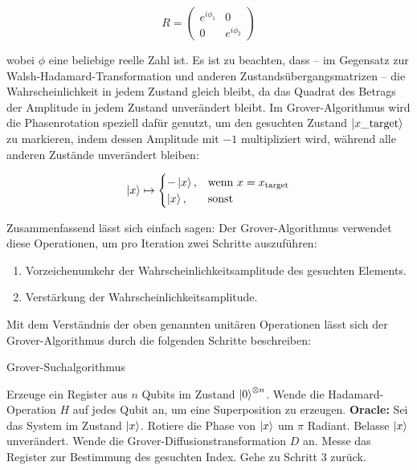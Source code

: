 \begin{enumerate}
    $$
R = \begin{pmatrix}
e^{i\phi_1} & 0 \\
0 & e^{i\phi_2}
\end{pmatrix}
$$

wobei \( \phi \) eine beliebige reelle Zahl ist. Es ist zu beachten, dass – im Gegensatz zur Walsh-Hadamard-Transformation und anderen Zustandsübergangsmatrizen – die Wahrscheinlichkeit in jedem Zustand gleich bleibt, da das Quadrat des Betrags der Amplitude in jedem Zustand unverändert bleibt.
Im Grover-Algorithmus wird die Phasenrotation speziell dafür genutzt, um den gesuchten Zustand $\ket{x\_{\text{target}}}$ zu markieren, indem dessen Amplitude mit $-1$ multipliziert wird, während alle anderen Zustände unverändert bleiben:

$$
\ket{x} \mapsto 
\begin{cases}
- \ket{x}, & \text{wenn } x = x_{\text{target}} \\
\ket{x}, & \text{sonst}
\end{cases}
$$

\end{enumerate}

Zusammenfassend lässt sich einfach sagen: Der Grover-Algorithmus verwendet diese Operationen, um pro Iteration zwei Schritte auszuführen:
\begin{enumerate}
  \item Vorzeichenumkehr der Wahrscheinlichkeitsamplitude des gesuchten Elements.
  \item Verstärkung der Wahrscheinlichkeitsamplitude.
\end{enumerate}

Mit dem Verständnis der oben genannten unitären Operationen lässt sich der Grover-Algorithmus durch die folgenden Schritte beschreiben:

\begin{algorithm}[H]
\label{alg:grover}
\caption{Grover-Suchalgorithmus}
\begin{algorithmic}[1]
\State Erzeuge ein Register aus \( n \) Qubits im Zustand \( \ket{0}^{\otimes n} \).
\State Wende die Hadamard-Operation \( H \) auf jedes Qubit an, um eine Superposition zu erzeugen.
\Repeat
  \State\textbf{Oracle:}
  \Statex \hspace{1em} Sei das System im Zustand \( \ket{x} \).
    \State Rotiere die Phase von \( \ket{x} \) um \( \pi \) Radiant.
  \Else
    \State Belasse \( \ket{x} \) unverändert.
  \EndIf
  \State Wende die Grover-Diffusionstransformation $D$ an.
  \State Messe das Register zur Bestimmung des gesuchten Index.
  \State Gehe zu Schritt 3 zurück.
\EndIf
{}
\end{algorithmic}
\end{algorithm}

